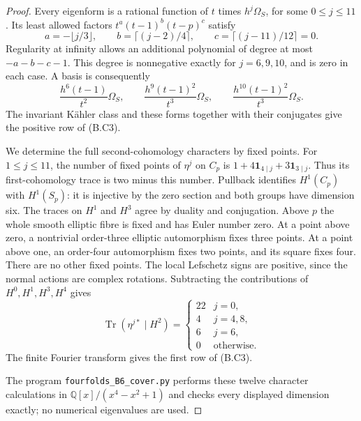 \begin{proof}
Every eigenform is a rational function of $t$ times
$h^j\Omega_S$, for some $0\leq j\leq11$.  Its least allowed
factors $t^a(t-1)^b(t-p)^c$ satisfy
\[
 a=-\lfloor j/3\rfloor,\qquad
 b=\lceil(j-2)/4\rceil,\qquad
 c=\lceil(j-11)/12\rceil=0.
\]
Regularity at infinity allows an additional polynomial of
degree at most $-a-b-c-1$.  This degree is nonnegative exactly
for $j=6,9,10$, and is zero in each case.  A basis is consequently
\[
 \frac{h^6(t-1)}{t^2}\Omega_S,\qquad
 \frac{h^9(t-1)^2}{t^3}\Omega_S,\qquad
 \frac{h^{10}(t-1)^2}{t^3}\Omega_S .
 \tag{B.C4}
\]
The invariant K\"ahler class and these forms together with their
conjugates give the positive row of (B.C3).

We determine the full second-cohomology characters by fixed points.
For $1\leq j\leq11$, the number of fixed points of $\eta^j$ on
$C_p$ is
$1+4\mathbf 1_{4\mid j}+3\mathbf 1_{3\mid j}$.
Thus its first-cohomology trace is two minus this number.
Pullback identifies $H^1(C_p)$ with $H^1(S_p)$: it is injective
by the zero section and both groups have dimension six.
The traces on $H^1$ and $H^3$ agree by duality and conjugation.
Above $p$ the whole smooth elliptic fibre is fixed and has Euler
number zero.  At a point above zero, a nontrivial order-three
elliptic automorphism fixes three points.  At a point above one,
an order-four automorphism fixes two points, and its square fixes
four.  There are no other fixed points.  The local Lefschetz signs
are positive, since the normal actions are complex rotations.
Subtracting the contributions of $H^0,H^1,H^3,H^4$ gives
\[
 \operatorname{Tr}(\eta^{j*}\mid H^2)=
 \begin{cases}
 22&j=0,\\
 4&j=4,8,\\
 6&j=6,\\
 0&\text{otherwise}.
 \end{cases}
\]
The finite Fourier transform gives the first row of (B.C3).

The program \texttt{fourfolds\_B6\_cover.py} performs these twelve
character calculations in $\mathbb Q[x]/(x^4-x^2+1)$ and checks
every displayed dimension exactly; no numerical eigenvalues are used.
\end{proof}

